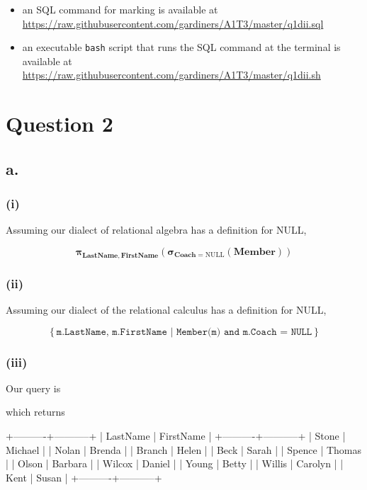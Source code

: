 \documentclass{article}
\newcommand{\select}[1]{
\boldsymbol{\sigma}_{#1}
}
\newcommand{\project}[1]{
\boldsymbol{\pi}_{#1}
}
\begin{document}
\begin{itemize}
    \item an SQL command for marking is available at \url{https://raw.githubusercontent.com/gardiners/A1T3/master/q1dii.sql}
    \item an executable \texttt{bash} script that runs the SQL command at the terminal is available at \url{https://raw.githubusercontent.com/gardiners/A1T3/master/q1dii.sh}
\end{itemize}

\section{Question 2}

\subsection{a.}

\subsubsection{(i)}

Assuming our dialect of relational algebra has a definition for NULL,

$$
\project{\mathbf{LastName, FirstName}}
\left(
\select{\mathbf{Coach} = \text{NULL}}\left(\mathbf{Member}\right)
\right)
$$

\subsubsection{(ii)}

Assuming our dialect of the relational calculus has a definition for NULL,

$$
\left\{
\texttt{m.LastName, m.FirstName | Member(m) and m.Coach = NULL}
\right\}
$$

\subsubsection{(iii)}

Our query is


which returns

\begin{bashinline}
+----------+-----------+
| LastName | FirstName |
+----------+-----------+
| Stone    | Michael   |
| Nolan    | Brenda    |
| Branch   | Helen     |
| Beck     | Sarah     |
| Spence   | Thomas    |
| Olson    | Barbara   |
| Wilcox   | Daniel    |
| Young    | Betty     |
| Willis   | Carolyn   |
| Kent     | Susan     |
+----------+-----------+
\end{bashinline}
\end{document}
